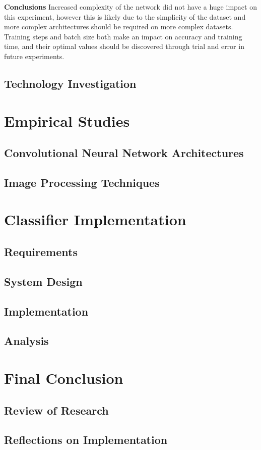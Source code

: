 \documentclass[12pt]{report}
\begin{document}
\begin{flushleft}
\vspace{0.5cm}
\textbf{Conclusions}
\linebreak
Increased complexity of the network did not have a huge impact on this experiment, however this is likely due to the simplicity of the dataset and more complex architectures should be required on more complex datasets. Training steps and batch size both make an impact on accuracy and training time, and their optimal values should be discovered through trial and error in future experiments.

\end{flushleft}

\section{Technology Investigation}

\newpage
\chapter{Empirical Studies}
\section{Convolutional Neural Network Architectures}
\section{Image Processing Techniques}

\newpage
\chapter{Classifier Implementation}
\section{Requirements}
\section{System Design}
\section{Implementation}
\section{Analysis}

\newpage
\chapter{Final Conclusion}
\section{Review of Research}
\section{Reflections on Implementation}

\printbibliography
\end{document}
